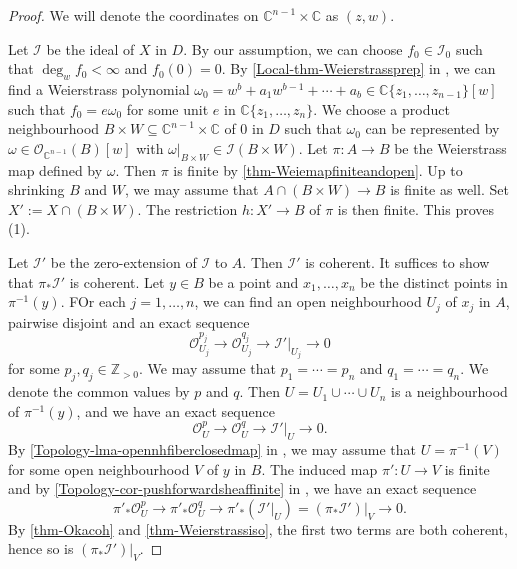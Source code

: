 \begin{proof}
    We will denote the coordinates on $\mathbb{C}^{n-1}\times \mathbb{C}$ as $(z,w)$.

    Let $\mathcal{I}$ be the ideal of $X$ in $D$. By our assumption, we can choose $f_0\in \mathcal{I}_0$ such that $\deg_w f_0<\infty$ and $f_0(0)=0$. By \cref{Local-thm-Weierstrassprep} in , we can find a Weierstrass polynomial $\omega_0=w^b+a_1w^{b-1}+\cdots+a_b\in \mathbb{C}\{ z_1,\ldots,z_{n-1} \}[w]$ such that $f_0=e\omega_0$ for some unit $e$ in $\mathbb{C}\{ z_1,\ldots,z_{n} \}$. We choose a product neighbourhood $B\times W\subseteq \mathbb{C}^{n-1}\times \mathbb{C}$ of $0$ in $D$ such that $\omega_0$ can be represented by $\omega\in \mathcal{O}_{\mathbb{C}^{n-1}}(B)[w]$ with $\omega|_{B\times W}\in \mathcal{I}(B\times W)$. Let $\pi:A\rightarrow B$ be the Weierstrass map defined by $\omega$. Then $\pi$ is finite by \cref{thm-Weiemapfiniteandopen}. 
    Up to shrinking $B$ and $W$, we may assume that $A\cap (B\times W)\rightarrow B$ is finite as well. Set $X':=X\cap (B\times W)$. The restriction $h:X'\rightarrow B$ of $\pi$ is then finite. This proves (1).

    Let $\mathcal{I}'$ be the zero-extension of $\mathcal{I}$ to $A$. Then $\mathcal{I}'$ is coherent. It suffices to show that $\pi_*\mathcal{I}'$ is coherent. Let $y\in B$ be a point and $x_1,\ldots,x_n$ be the distinct points in $\pi^{-1}(y)$.  FOr each $j=1,\ldots,n$, we can find an open neighbourhood $U_j$ of $x_j$ in $A$, pairwise disjoint and an exact sequence 
    \[
        \mathcal{O}_{U_j}^{p_j}\rightarrow \mathcal{O}_{U_j}^{q_j}\rightarrow \mathcal{I}'|_{U_j}\rightarrow 0
    \]
    for some $p_j,q_j\in \mathbb{Z}_{>0}$.  We may assume that $p_1=\cdots=p_n$ and $q_1=\cdots=q_n$. We denote the common values by $p$ and $q$. Then $U=U_1\cup\cdots\cup U_n$ is a neighbourhood of $\pi^{-1}(y)$, and we have an exact sequence 
    \[
        \mathcal{O}_{U}^{p}\rightarrow \mathcal{O}_{U}^{q}\rightarrow \mathcal{I}'|_{U}\rightarrow 0.
    \]
    By \cref{Topology-lma-opennhfiberclosedmap} in , we may assume that $U=\pi^{-1}(V)$ for some open neighbourhood $V$ of $y$ in $B$. The induced map $\pi':U\rightarrow V$ is finite and by \cref{Topology-cor-pushforwardsheaffinite} in , we have an exact sequence
    \[
        \pi'_*\mathcal{O}_{U}^{p}\rightarrow \pi'_*\mathcal{O}_{U}^{q}\rightarrow \pi'_*\left(\mathcal{I}'|_{U}\right)=(\pi_*\mathcal{I}')|_V\rightarrow 0.
    \]
    By \cref{thm-Okacoh} and \cref{thm-Weierstrassiso}, the first two terms are both coherent, hence so is $(\pi_*\mathcal{I}')|_V$.
\end{proof}

